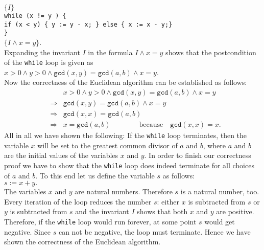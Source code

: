 \noindent
\hspace*{1.3cm} 
$\{ I \}$
\\[0.1cm]
\hspace*{2.2cm}
\texttt{while (x != y ) \{} \\[0.1cm]
\hspace*{3.2cm}
         \texttt{if (x < y) \{ y := y - x; \} else \{ x := x - y;\}}
\\[0.1cm]
\hspace*{2.2cm}
\texttt{\}} \quad 
\\[0.1cm]
\hspace*{1.3cm}
$\{ I \wedge x = y \}$. 
\\[0.2cm]
Expanding the invariant $I$ in the formula $I \wedge x = y$ shows that the postcondition of the 
\texttt{while} loop is given as
\\[0.2cm]
\hspace*{1.3cm}
$x > 0 \wedge y > 0 \wedge \texttt{gcd}(x,y) = \texttt{gcd}(a,b) \wedge x = y$.
\\[0.2cm]
Now the correctness of the Euclidean algorithm can be established as follows:
\begin{eqnarray*}
&             &  x > 0 \wedge y > 0 \wedge \texttt{gcd}(x,y) = \texttt{gcd}(a,b) \wedge x = y \\
& \Rightarrow & \texttt{gcd}(x,y) = \texttt{gcd}(a,b) \wedge x = y \\
& \Rightarrow & \texttt{gcd}(x,x) = \texttt{gcd}(a,b)  \\
& \Rightarrow & x = \texttt{gcd}(a,b) \qquad\qquad \mathrm{because} \quad \texttt{gcd}(x,x) = x.
\end{eqnarray*}
All in all we have shown the following: If the \texttt{while} loop terminates, then
the variable $x$ will be set to the greatest common divisor of $a$ and $b$, where $a$ and $b$ are
the initial values of the variables $x$ and $y$.  In order to finish our correctness proof we have
to show that the \texttt{while} loop does indeed terminate for all choices of $a$ and $b$.
To this end let us define the variable $s$ as follows:
\\[0.2cm]
\hspace*{1.3cm}
$ s := x + y. $
\\[0.2cm]
The variables $x$ and $y$ are natural numbers.  Therefore $s$ is a natural number, too.
Every iteration of the loop reduces the number $s$: either $x$ is subtracted from $s$
or $y$ is subtracted from  $s$ and the invariant $I$ shows that both $x$ and $y$ are
positive.  Therefore, if the \texttt{while} loop would run forever, at some point $s$ would get
negative.  Since $s$ can not be negative, the loop must terminate.
Hence we have shown the correctness of the Euclidean  algorithm.
\pagebreak

